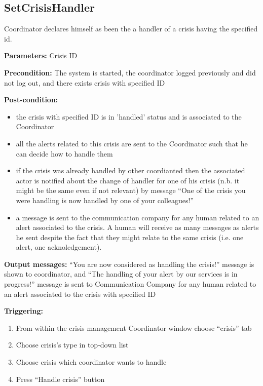 \subsection{SetCrisisHandler}

Coordinator declares himself as been the a handler of a crisis having the
specified id.

\begin{description}

\item \textbf{Parameters:} Crisis ID
\item \textbf{Precondition:} The system is started, the coordinator logged
previously and did not log out, and there exists crisis with specified ID
\item \textbf{Post-condition:} 
\begin{itemize}
  \item the crisis with specified ID is in 'handled' status and is associated to
  the Coordinator
  \item all the alerts related to this crisis are sent to the Coordinator such
  that he can decide how to handle them
  \item if the crisis was already handled by other coordianted then the
  associated actor is notified about the change of handler for one of his crisis
  (n.b. it might be the same even if not relevant) by message ``One of
  the crisis you were handling is now handled by one of your colleagues!''
  \item a message is sent to the communication company for any human related to
  an alert associated to the crisis. A human will receive as many messages as
  alerts he sent despite the fact that they might relate to the same crisis
  (i.e. one alert, one acknoledgement).
\end{itemize}
\item \textbf{Output messages:} ``You are now considered as handling the
crisis!'' message is shown to coordinator, and ``The handling of your alert by
our services is in progress!'' message is sent to Communication Company for any
human related to an alert associated to the crisis with specified ID

\item \textbf{Triggering:}
\begin{enumerate}
\item From within the crisis management Coordinator window choose ``crisis'' tab
\item Choose crisis's type in top-down list
\item Choose crisis which coordinator wants to handle
\item Press ``Handle crisis'' button
\end{enumerate}

\end{description}

